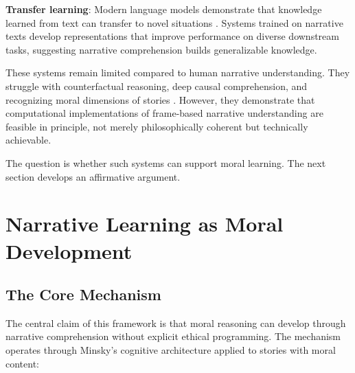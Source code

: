 \documentclass[12pt]{article}
\begin{document}
\textbf{Transfer learning}: Modern language models demonstrate that knowledge learned from text can transfer to novel situations \citep{devlin2018bert, brown2020language}. Systems trained on narrative texts develop representations that improve performance on diverse downstream tasks, suggesting narrative comprehension builds generalizable knowledge.

These systems remain limited compared to human narrative understanding. They struggle with counterfactual reasoning, deep causal comprehension, and recognizing moral dimensions of stories \citep{sap2019socialiqa, forbes2020social}. However, they demonstrate that computational implementations of frame-based narrative understanding are feasible in principle, not merely philosophically coherent but technically achievable.

The question is whether such systems can support moral learning. The next section develops an affirmative argument.

\section{Narrative Learning as Moral Development}

\subsection{The Core Mechanism}

The central claim of this framework is that moral reasoning can develop through narrative comprehension without explicit ethical programming. The mechanism operates through Minsky's cognitive architecture applied to stories with moral content:
\end{document}
